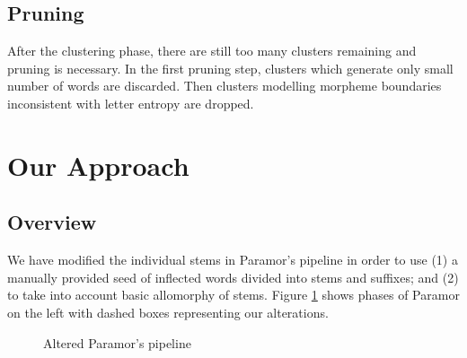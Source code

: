 \documentclass[11pt]{article}
\begin{document}
\subsection{Pruning}

\noindent
After the clustering phase, there are still too many clusters remaining and pruning is necessary. In the first pruning step, clusters which generate only small number of words are discarded. 
Then clusters modelling morpheme boundaries inconsistent with letter entropy are dropped.


%

\section{Our Approach}

\subsection{Overview}


\noindent
We have modified the individual stems in Paramor's pipeline in order to use (1) a manually provided seed of inflected words divided into stems and suffixes; and (2) to take into account basic allomorphy of stems.
%
Figure \ref{fig:overview} shows phases of Paramor on the left with dashed boxes representing our alterations.


\begin{figure}

\caption{Altered Paramor's pipeline}
\label{fig:overview}
\end{figure}
\end{document}
